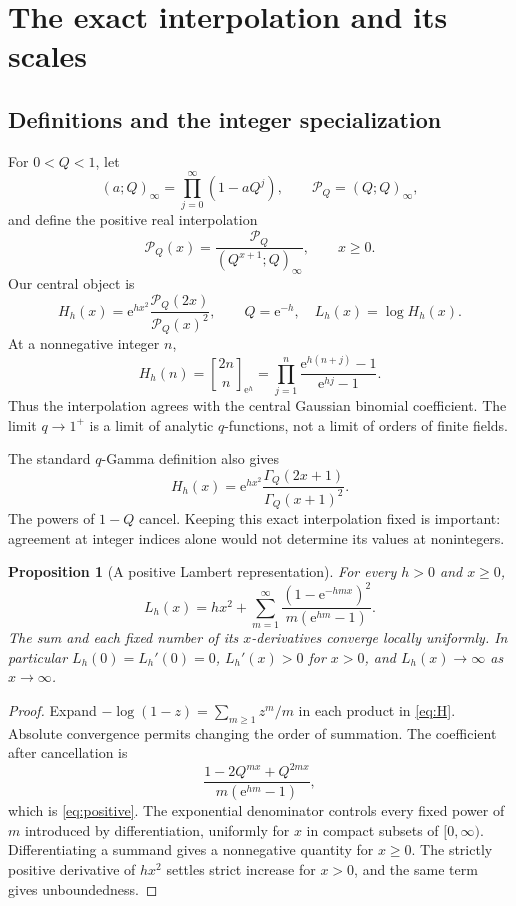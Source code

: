 \documentclass[11pt,a4paper]{article}
\numberwithin{equation}{section}
\newtheorem{proposition}[theorem]{Proposition}
\theoremstyle{definition}
\newcommand{\ee}{\mathrm e}
\newcommand{\Pq}{\mathcal P}
\newcommand{\qbin}[3]{\genfrac{[}{]}{0pt}{}{#1}{#2}_{#3}}
\begin{document}
\section{The exact interpolation and its scales}
\label{sec:exact}

\subsection{Definitions and the integer specialization}
For $0<Q<1$, let
\[
(a;Q)_\infty=\prod_{j=0}^{\infty}(1-aQ^j),\qquad
\Pq_Q=(Q;Q)_\infty,
\]
and define the positive real interpolation
\begin{equation}
\Pq_Q(x)=\frac{\Pq_Q}{(Q^{x+1};Q)_\infty},\qquad x\ge0.
\label{eq:factorialinterp}
\end{equation}
Our central object is
\begin{equation}
H_h(x)=\ee^{hx^2}\frac{\Pq_Q(2x)}{\Pq_Q(x)^2},
\qquad Q=\ee^{-h},\quad L_h(x)=\log H_h(x).
\label{eq:H}
\end{equation}
At a nonnegative integer $n$,
\[
H_h(n)=\qbin{2n}{n}{\ee^h}
      =\prod_{j=1}^n\frac{\ee^{h(n+j)}-1}{\ee^{hj}-1}.
\]
Thus the interpolation agrees with the central Gaussian binomial coefficient. The limit $q\to1^+$ is a limit of analytic $q$-functions, not a limit of orders of finite fields.

The standard $q$-Gamma definition also gives
\[
H_h(x)=\ee^{hx^2}\frac{\Gamma_Q(2x+1)}{\Gamma_Q(x+1)^2}.
\]
The powers of $1-Q$ cancel. Keeping this exact interpolation fixed is important: agreement at integer indices alone would not determine its values at nonintegers.

\begin{proposition}[A positive Lambert representation]
\label{prop:positive}
For every $h>0$ and $x\ge0$,
\begin{equation}
L_h(x)=hx^2+\sum_{m=1}^{\infty}
      \frac{(1-\ee^{-hmx})^2}{m(\ee^{hm}-1)}.
\label{eq:positive}
\end{equation}
The sum and each fixed number of its $x$-derivatives converge locally uniformly. In particular $L_h(0)=L_h'(0)=0$, $L_h'(x)>0$ for $x>0$, and $L_h(x)\to\infty$ as $x\to\infty$.
\end{proposition}
\begin{proof}
Expand $-\log(1-z)=\sum_{m\ge1}z^m/m$ in each product in \eqref{eq:H}. Absolute convergence permits changing the order of summation. The coefficient after cancellation is
\[
\frac{1-2Q^{mx}+Q^{2mx}}{m(\ee^{hm}-1)},
\]
which is \eqref{eq:positive}. The exponential denominator controls every fixed power of $m$ introduced by differentiation, uniformly for $x$ in compact subsets of $[0,\infty)$. Differentiating a summand gives a nonnegative quantity for $x\ge0$. The strictly positive derivative of $hx^2$ settles strict increase for $x>0$, and the same term gives unboundedness.
\end{proof}
\end{document}
